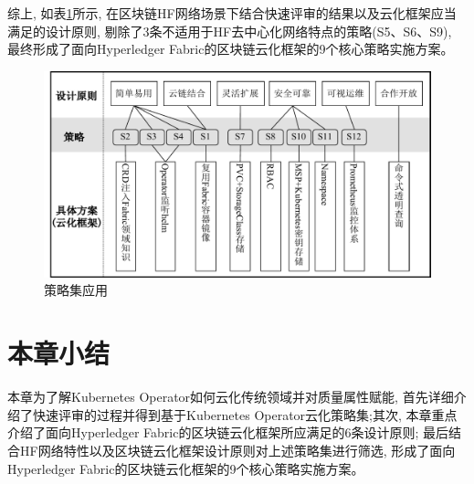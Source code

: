 综上, 如表\ref{policy_set_application}所示, 在区块链HF网络场景下结合快速评审的结果以及云化框架应当满足的设计原则, 剔除了3条不适用于HF去中心化网络特点的策略(S5、S6、S9), 最终形成了面向Hyperledger Fabric的区块链云化框架的9个核心策略实施方案。

\begin{figure}[h] %
    \centering %
    \includegraphics[width=1.0\textwidth]{FIGs/chapter3/policy_characteristics.pdf} %
    \caption{策略集应用} %
    \label{policy_set_application} %
\end{figure}%


\section{本章小结}

本章为了解Kubernetes Operator如何云化传统领域并对质量属性赋能, 首先详细介绍了快速评审的过程并得到基于Kubernetes Operator云化策略集;其次, 本章重点介绍了面向Hyperledger Fabric的区块链云化框架所应满足的6条设计原则; 最后结合HF网络特性以及区块链云化框架设计原则对上述策略集进行筛选, 形成了面向Hyperledger Fabric的区块链云化框架的9个核心策略实施方案。